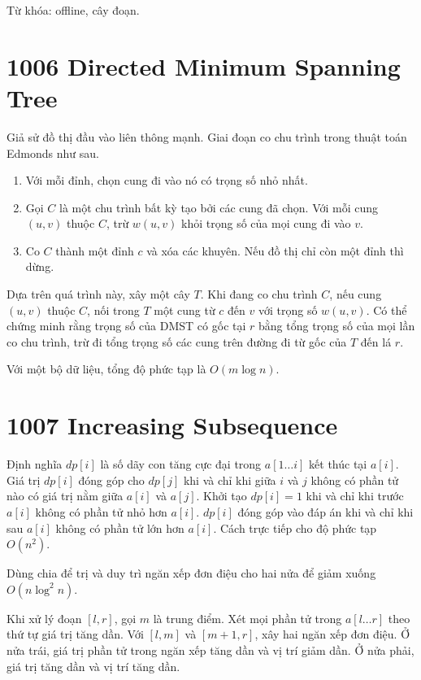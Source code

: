 \documentclass[11pt]{article}
\begin{document}
Từ khóa: offline, cây đoạn.

\section{1006 Directed Minimum Spanning Tree}

Giả sử đồ thị đầu vào liên thông mạnh. Giai đoạn co chu trình trong thuật
toán Edmonds như sau.

\begin{enumerate}
  \item Với mỗi đỉnh, chọn cung đi vào nó có trọng số nhỏ nhất.
  \item Gọi $C$ là một chu trình bất kỳ tạo bởi các cung đã chọn. Với mỗi
  cung $(u,v)$ thuộc $C$, trừ $w(u,v)$ khỏi trọng số của mọi cung đi vào
  $v$.
  \item Co $C$ thành một đỉnh $c$ và xóa các khuyên. Nếu đồ thị chỉ còn một
  đỉnh thì dừng.
\end{enumerate}

Dựa trên quá trình này, xây một cây $T$. Khi đang co chu trình $C$, nếu cung
$(u,v)$ thuộc $C$, nối trong $T$ một cung từ $c$ đến $v$ với trọng số
$w(u,v)$. Có thể chứng minh rằng trọng số của DMST có gốc tại $r$ bằng tổng
trọng số của mọi lần co chu trình, trừ đi tổng trọng số các cung trên đường
đi từ gốc của $T$ đến lá $r$.

Với một bộ dữ liệu, tổng độ phức tạp là $O(m\log n)$.

\section{1007 Increasing Subsequence}

Định nghĩa $dp[i]$ là số dãy con tăng cực đại trong $a[1\ldots i]$ kết thúc
tại $a[i]$. Giá trị $dp[i]$ đóng góp cho $dp[j]$ khi và chỉ khi giữa $i$ và
$j$ không có phần tử nào có giá trị nằm giữa $a[i]$ và $a[j]$. Khởi tạo
$dp[i]=1$ khi và chỉ khi trước $a[i]$ không có phần tử nhỏ hơn $a[i]$.
$dp[i]$ đóng góp vào đáp án khi và chỉ khi sau $a[i]$ không có phần tử lớn
hơn $a[i]$. Cách trực tiếp cho độ phức tạp $O(n^2)$.

Dùng chia để trị và duy trì ngăn xếp đơn điệu cho hai nửa để giảm xuống
$O(n\log^2 n)$.

Khi xử lý đoạn $[l,r]$, gọi $m$ là trung điểm. Xét mọi phần tử trong
$a[l\ldots r]$ theo thứ tự giá trị tăng dần. Với $[l,m]$ và $[m+1,r]$, xây
hai ngăn xếp đơn điệu. Ở nửa trái, giá trị phần tử trong ngăn xếp tăng dần và
vị trí giảm dần. Ở nửa phải, giá trị tăng dần và vị trí tăng dần.
\end{document}
